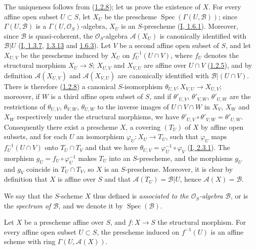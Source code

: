 The uniqueness follows from (\hyperref[II.1.2.8]{1.2.8}); let us prove
the existence of $X$. For every affine open subset $U\subset S$, let $X_U$ be
the prescheme $\operatorname{Spec}(\Gamma(U,\mathcal{B}))$; since
$\Gamma(U,\mathcal{B})$ is a $\Gamma(U,\mathcal{O}_S)$-algebra, $X_U$
is an $S$-prescheme (\hyperref[I.1.6.1]{I, 1.6.1}). Moreover, since
$\mathcal{B}$ is quasi-coherent, the $\mathcal{O}_S$-algebra
$\mathcal{A}(X_U)$ is canonically identified with $\mathcal{B}|U$
(\hyperref[I.1.3.7]{I, 1.3.7},
\hyperref[I.1.3.13]{1.3.13} and
\hyperref[I.1.6.3]{1.6.3}). Let $V$ be a second affine open subset of
$S$, and let $X_{U,V}$ be the prescheme induced by $X_U$ on
$f_U^{-1}(U\cap V)$, where $f_U$ denotes the structural morphism
$X_U\to S$; $X_{U,V}$ and
$X_{V,U}$ are affine over $U\cap V$
(\hyperref[II.1.2.5]{1.2.5}), and by definition $\mathcal{A}(X_{U,V})$
and $\mathcal{A}(X_{V,U})$ are canonically identified with
$\mathcal{B}|(U\cap V)$. There is therefore
(\hyperref[II.1.2.8]{1.2.8}) a canonical $S$-isomorphism
$\theta_{U,V}:X_{V,U}\to X_{U,V}$; moreover, if $W$ is a third
affine open subset of $S$, and if $\theta'_{U,V}$, $\theta'_{V,W}$,
$\theta'_{U,W}$ are the restrictions of $\theta_{U,V}$, $\theta_{V,W}$,
$\theta_{U,W}$ to the inverse images of $U\cap V\cap W$ in $X_V$,
$X_W$ and $X_W$ respectively under the structural morphisms, we have
$\theta'_{U,V}\circ\theta'_{V,W}=\theta'_{U,W}$. Consequently there exist a
prescheme $X$, a covering $(T_U)$ of $X$ by affine open subsets, and
for each $U$ an isomorphism $\varphi_U:X_U\to T_U$, such that
$\varphi_U$ maps $f_U^{-1}(U\cap V)$ onto $T_U\cap T_V$ and that we have
$\theta_{U,V}=\varphi_U^{-1}\circ\varphi_V$
(\hyperref[I.2.3.1]{I, 2.3.1}). The morphism
$g_U=f_U\circ\varphi_U^{-1}$ makes $T_U$ into an $S$-prescheme, and the
morphisms $g_U$ and $g_V$ coincide in $T_U\cap T_V$, so $X$ is an
$S$-prescheme. Moreover, it is clear by definition that $X$ is affine
over $S$ and that $\mathcal{A}(T_U)=\mathcal{B}|U$, hence
$\mathcal{A}(X)=\mathcal{B}$.

We say that the $S$-scheme $X$ thus defined is \emph{associated to the
$\mathcal{O}_S$-algebra $\mathcal{B}$}, or is the \emph{spectrum of
$\mathcal{B}$}, and we denote it by $\operatorname{Spec}(\mathcal{B})$.

\begin{corollary}[1.3.2]
\label{II.1.3.2}
Let $X$ be a prescheme affine over $S$, and $f:X\to S$ the structural
morphism. For every affine open subset $U\subset S$, the prescheme induced
on $f^{-1}(U)$ is an affine scheme with ring
$\Gamma(U,\mathcal{A}(X))$.
\end{corollary}

